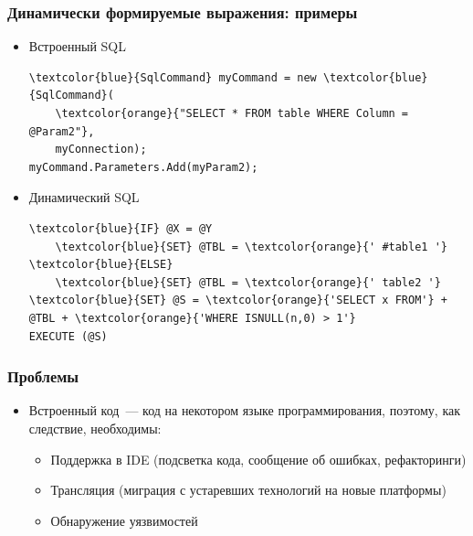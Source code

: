 \documentclass{beamer}
\begin{document}
\begin{frame}[fragile]
  \transwipe[direction=90]
  \frametitle{Динамически формируемые выражения: примеры}
  \begin{itemize}
    \item Встроенный SQL
      \begin{Verbatim}[commandchars=\\\{\}]
\textcolor{blue}{SqlCommand} myCommand = new \textcolor{blue}{SqlCommand}(
    \textcolor{orange}{"SELECT * FROM table WHERE Column = @Param2"},
    myConnection);
myCommand.Parameters.Add(myParam2);
      \end{Verbatim}

    \item Динамический SQL
      \begin{Verbatim}[commandchars=\\\{\}]
\textcolor{blue}{IF} @X = @Y
    \textcolor{blue}{SET} @TBL = \textcolor{orange}{' #table1 '}
\textcolor{blue}{ELSE}
    \textcolor{blue}{SET} @TBL = \textcolor{orange}{' table2 '}
\textcolor{blue}{SET} @S = \textcolor{orange}{'SELECT x FROM'} + @TBL + \textcolor{orange}{'WHERE ISNULL(n,0) > 1'}
EXECUTE (@S)
       \end{Verbatim}
    \end{itemize}
\end{frame}

\begin{frame}
  \transwipe[direction=90]
  \frametitle{Проблемы}  
  \begin{itemize}
    \item Встроенный код~--- код на некотором языке программирования, поэтому, как следствие, необходимы:
    \begin{itemize}
      \item Поддержка в IDE (подсветка кода, сообщение об ошибках, рефакторинги)
      \item Трансляция (миграция с устаревших технологий на новые платформы)
      \item Обнаружение уязвимостей
    \end{itemize}
  \end{itemize}
\end{frame}
\end{document}
